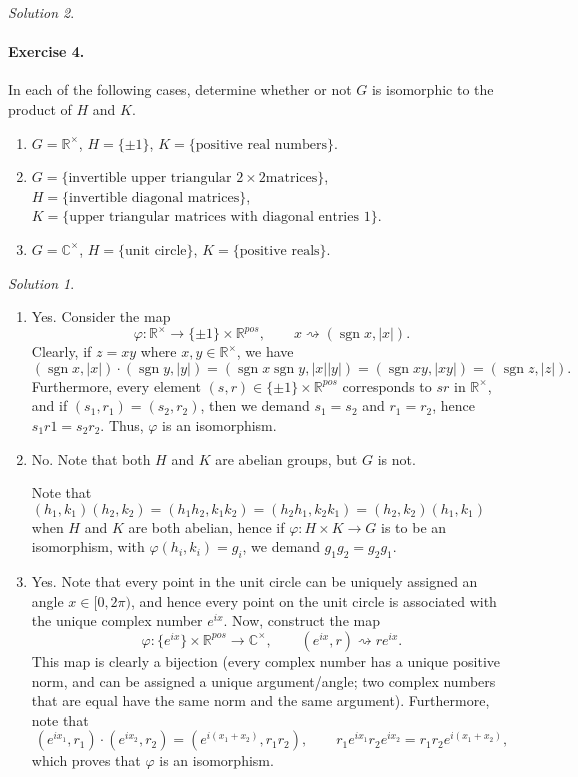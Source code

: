 \documentclass[11pt]{report}
\def\C{\mathbb{C}}
\def\R{\mathbb{R}}
\DeclareMathOperator\sgn{sgn}
\theoremstyle{remark}
\newtheorem*{solution}{Solution}
\begin{document}
\begin{solution}
    \paragraph{Exercise 4.} In each of the following cases, determine whether or not
    $G$ is isomorphic to the product of $H$ and $K$.
    \begin{enumerate}
        \itemsep0em
        \item $G = \R^\times$, $H = \{\pm 1\}$, $K = \{\text{positive real
        numbers}\}$.
        \item $G = \{\text{invertible upper triangular }2\times 2\text{
        matrices}\}$, $H = \{\text{invertible diagonal matrices}\}$, $K =
        \{\text{upper triangular matrices with diagonal entries }1\}$.
        \item $G = \C^\times$, $H = \{\text{unit circle}\}$, $K = \{\text{positive
        reals}\}$.
    \end{enumerate}
    \begin{solution} \mbox{}
    \begin{enumerate}
        \item Yes. Consider the map \[
            \varphi\colon \R^\times \to \{\pm 1\}\times \R^{pos}, \qquad
            x \rightsquigarrow (\sgn{x}, |x|).
        \] Clearly, if $z = xy$ where $x, y \in \R^\times$, we have \[
            (\sgn{x}, |x|)\cdot(\sgn{y}, |y|) = (\sgn{x}\sgn{y}, |x| |y|) =
            (\sgn{xy}, |xy|) = (\sgn{z}, |z|).
        \] Furthermore, every element $(s, r) \in \{\pm 1\}\times\R^{pos}$
        corresponds to $sr$ in $\R^\times$, and if $(s_1, r_1) = (s_2, r_2)$, then
        we demand $s_1 = s_2$ and $r_1 = r_2$, hence $s_1r1 = s_2r_2$. Thus,
        $\varphi$ is an isomorphism.

        \item No. Note that both $H$ and $K$ are abelian groups, but $G$ is not.

        Note that $(h_1, k_1)(h_2, k_2) = (h_1h_2, k_1k_2) = (h_2h_1, k_2k_1) = (h_2,
        k_2)(h_1, k_1)$ when $H$ and $K$ are both abelian, hence if $\varphi\colon
        H\times K \to G$ is to be an isomorphism, with $\varphi(h_i, k_i) = g_i$, we
        demand $g_1g_2 = g_2g_1$.

        \item Yes. Note that every point in the unit circle can be uniquely assigned
        an angle $x \in [0, 2\pi)$, and hence every point on the unit circle is
        associated with the unique complex number $e^{ix}$. Now, construct the map
        \[
            \varphi\colon \{e^{ix}\}\times \R^{pos} \to \C^\times, \qquad
            (e^{ix}, r) \rightsquigarrow re^{ix}.
        \] This map is clearly a bijection (every complex number has a unique
        positive norm, and can be assigned a unique argument/angle; two complex
        numbers that are equal have the same norm and the same argument).
        Furthermore, note that \[
            (e^{ix_1}, r_1)\cdot (e^{ix_2}, r_2) = (e^{i(x_1 + x_2)}, r_1r_2), \qquad 
            r_1e^{ix_1} r_2e^{ix_2} = r_1r_2 e^{i(x_1 + x_2)},
        \] which proves that $\varphi$ is an isomorphism.
    \end{enumerate}
    \end{solution}
    

\end{solution}
\end{document}
